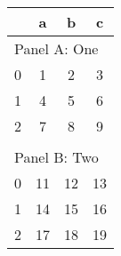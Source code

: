 \begin{tabular}{lccc}
\toprule
  & a & b & c\\
\midrule
\multicolumn{4}{l}{Panel A: One}\\
0 & 1 & 2 & 3 \\
1 & 4 & 5 & 6 \\
2 & 7 & 8 & 9 \\
  &   &   &  \\
\multicolumn{4}{l}{Panel B: Two}\\
0 & 11 & 12 & 13 \\
1 & 14 & 15 & 16 \\
2 & 17 & 18 & 19 \\
\bottomrule

\end{tabular}